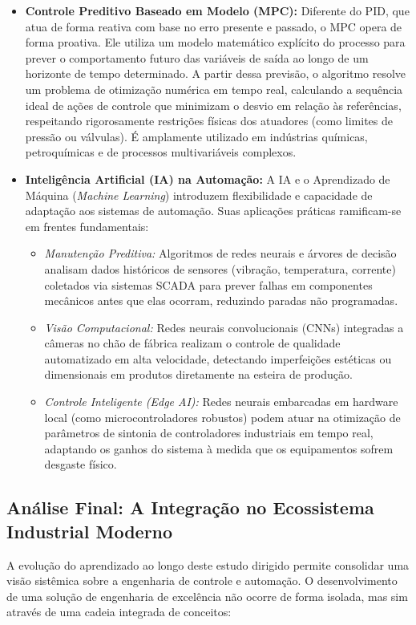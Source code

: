 \documentclass[12pt]{article}
\begin{document}
\begin{itemize}
    \item \textbf{Controle Preditivo Baseado em Modelo (MPC):} Diferente do PID, que atua de forma reativa com base no erro presente e passado, o MPC opera de forma proativa. Ele utiliza um modelo matemático explícito do processo para prever o comportamento futuro das variáveis de saída ao longo de um horizonte de tempo determinado. A partir dessa previsão, o algoritmo resolve um problema de otimização numérica em tempo real, calculando a sequência ideal de ações de controle que minimizam o desvio em relação às referências, respeitando rigorosamente restrições físicas dos atuadores (como limites de pressão ou válvulas). É amplamente utilizado em indústrias químicas, petroquímicas e de processos multivariáveis complexos.
    \item \textbf{Inteligência Artificial (IA) na Automação:} A IA e o Aprendizado de Máquina (\textit{Machine Learning}) introduzem flexibilidade e capacidade de adaptação aos sistemas de automação. Suas aplicações práticas ramificam-se em frentes fundamentais:
    \begin{itemize}
        \item \textit{Manutenção Preditiva:} Algoritmos de redes neurais e árvores de decisão analisam dados históricos de sensores (vibração, temperatura, corrente) coletados via sistemas SCADA para prever falhas em componentes mecânicos antes que elas ocorram, reduzindo paradas não programadas.
        \item \textit{Visão Computacional:} Redes neurais convolucionais (CNNs) integradas a câmeras no chão de fábrica realizam o controle de qualidade automatizado em alta velocidade, detectando imperfeições estéticas ou dimensionais em produtos diretamente na esteira de produção.
        \item \textit{Controle Inteligente (Edge AI):} Redes neurais embarcadas em hardware local (como microcontroladores robustos) podem atuar na otimização de parâmetros de sintonia de controladores industriais em tempo real, adaptando os ganhos do sistema à medida que os equipamentos sofrem desgaste físico.
    \end{itemize}
\end{itemize}

\subsection{Análise Final: A Integração no Ecossistema Industrial Moderno}
A evolução do aprendizado ao longo deste estudo dirigido permite consolidar uma visão sistêmica sobre a engenharia de controle e automação. O desenvolvimento de uma solução de engenharia de excelência não ocorre de forma isolada, mas sim através de uma cadeia integrada de conceitos:
\end{document}
